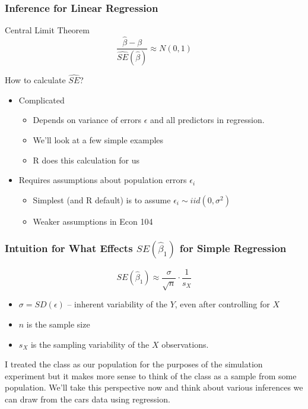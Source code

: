 \documentclass{beamer}
\begin{document}
\begin{frame}
\frametitle{Inference for Linear Regression}
	\begin{block}{Central Limit Theorem}
		$$\frac{\widehat{\beta} - \beta}{\widehat{SE}(\widehat{\beta})} \approx N(0,1)$$ 
\end{block}

\begin{block}{How to calculate $\widehat{SE}$?}
	\begin{itemize}
\item Complicated 
	\begin{itemize}
\item Depends on variance of errors $\epsilon$ and all predictors in regression. 
\item We'll look at a few simple examples 
\item R does this calculation for us 
\end{itemize}
\item Requires assumptions about population errors $\epsilon_i$ 
	\begin{itemize}
\item Simplest (and R default) is to assume $\epsilon_i \sim iid (0,\sigma^2)$ 
\item Weaker assumptions in Econ 104 
\end{itemize}

\end{itemize}
\end{block}

\end{frame}
\begin{frame}
\frametitle{Intuition for What Effects $SE(\widehat{\beta}_1)$ for Simple Regression}

	$$SE(\widehat{\beta}_1) \approx \frac{\sigma}{\sqrt{n}} \cdot \frac{1}{s_X}$$
	\begin{itemize}
	\item $\sigma = SD(\epsilon)$ -- inherent variability of the $Y$, even after controlling for $X$
	\item $n$ is the sample size
	\item $s_X$ is the sampling variability of the $X$ observations.
	\end{itemize}
\end{frame}


\begin{frame}
I treated the class as our population for the purposes of the simulation experiment but it makes more sense to think of the class as a sample from some population. We'll take this perspective now and think about various inferences we can draw from the cars data using regression.
\end{frame}
\end{document}
